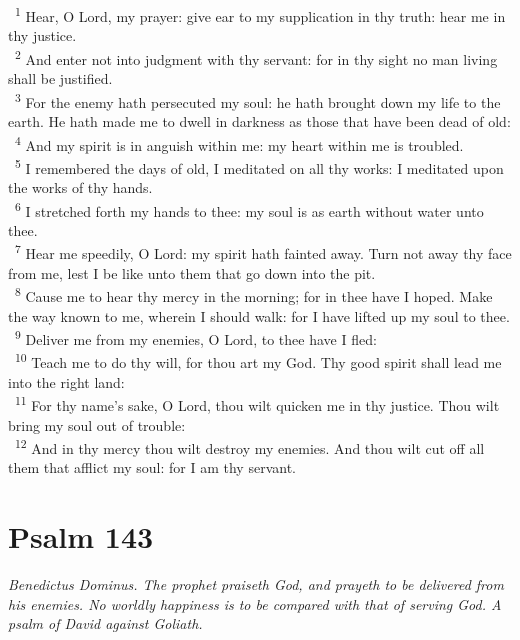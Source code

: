 \documentclass[a5paper,12pt]{article}
\begin{document}
\begin{multicols*}{2}
~\textsuperscript{1} Hear, O Lord, my prayer: give ear to my supplication in thy truth: hear me in thy justice.\\
~\textsuperscript{2} And enter not into judgment with thy servant: for in thy sight no man living shall be justified.\\
~\textsuperscript{3} For the enemy hath persecuted my soul: he hath brought down my life to the earth. He hath made me to dwell in darkness as those that have been dead of old:\\
~\textsuperscript{4} And my spirit is in anguish within me: my heart within me is troubled.\\
~\textsuperscript{5} I remembered the days of old, I meditated on all thy works: I meditated upon the works of thy hands.\\
~\textsuperscript{6} I stretched forth my hands to thee: my soul is as earth without water unto thee.\\
~\textsuperscript{7} Hear me speedily, O Lord: my spirit hath fainted away. Turn not away thy face from me, lest I be like unto them that go down into the pit.\\
~\textsuperscript{8} Cause me to hear thy mercy in the morning; for in thee have I hoped. Make the way known to me, wherein I should walk: for I have lifted up my soul to thee.\\
~\textsuperscript{9} Deliver me from my enemies, O Lord, to thee have I fled:\\
~\textsuperscript{10} Teach me to do thy will, for thou art my God. Thy good spirit shall lead me into the right land:\\
~\textsuperscript{11} For thy name's sake, O Lord, thou wilt quicken me in thy justice. Thou wilt bring my soul out of trouble:\\
~\textsuperscript{12} And in thy mercy thou wilt destroy my enemies. And thou wilt cut off all them that afflict my soul: for I am thy servant.\\

\section{Psalm 143}
\label{sec:orge0f1e0c}
\emph{Benedictus Dominus. The prophet praiseth God, and prayeth to be delivered from his enemies. No worldly happiness is to be compared with that of serving God. A psalm of David against Goliath.}\\


\end{multicols*}
\end{document}
